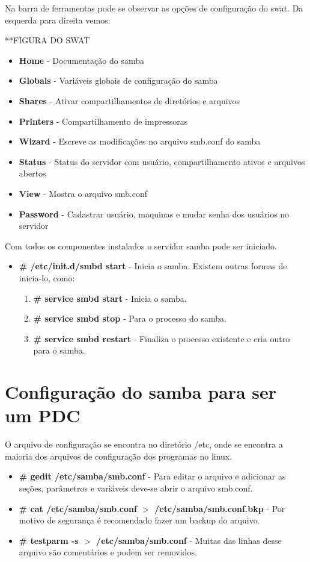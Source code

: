 Na barra de ferramentas pode se observar as opções de configuração do swat. Da esquerda para direita vemos:

**FIGURA DO SWAT

\begin{itemize}
    \item \textbf{Home} - Documentação do samba
    \item \textbf{Globals} - Variáveis globais de configuração do samba
    \item \textbf{Shares} - Ativar compartilhamentos de diretórios e arquivos
    \item \textbf{Printers} - Compartilhamento de impressoras
    \item \textbf{Wizard} - Escreve as modificações no arquivo smb.conf do samba
    \item \textbf{Status} - Status do servidor com usuário, compartilhamento ativos e arquivos abertos
    \item \textbf{View} - Mostra o arquivo smb.conf
    \item \textbf{Password} - Cadastrar usuário, maquinas e mudar senha dos usuários no servidor
\end{itemize}

Com todos os componentes instalados o servidor samba pode ser iniciado.

\begin{itemize}
	\item \textbf{\# /etc/init.d/smbd start} - Inicia o samba. Existem outras formas de inicia-lo, como:
		\begin{enumerate}
			\item \textbf{\# service smbd start} - Inicia o samba.
			\item \textbf{\# service smbd stop} - Para o processo do samba.
			\item \textbf{\# service smbd restart} - Finaliza o processo existente e cria outro para o samba.
		\end{enumerate}
\end{itemize}

\section{Configuração do samba para ser um PDC}

O arquivo de configuração se encontra no diretório /etc, onde se encontra a maioria dos arquivos de configuração dos programas no linux.

\begin{itemize}
	\item \textbf{\# gedit /etc/samba/smb.conf} - Para editar o arquivo e adicionar as seções, parâmetros e variáveis deve-se abrir o arquivo smb.conf.
	\item \textbf{\# cat /etc/samba/smb.conf $>$ /etc/samba/smb.conf.bkp} - Por motivo de segurança é recomendado fazer um backup do arquivo.
	\item \textbf{\# testparm -s $>$ /etc/samba/smb.conf} - Muitas das linhas desse arquivo são comentários e podem ser removidos.
\end{itemize}


